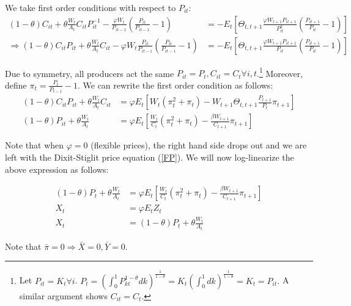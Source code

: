 \documentclass[11pt]{article} %
\begin{document}
We take first order conditions with respect to $P_{it}$:
\begin{align*}
(1-\theta)C_{it} + \theta\frac{W_t}{A_t}C_{it}P_{it}^{-1} - \frac{\varphi W_t}{P_{it-1}}\left(\frac{P_{it}}{P_{it-1}} - 1 \right) &=-E_t\left[\Theta_{t,t+1}\frac{\varphi W_{t+1}P_{it+1}}{P_{it}^2}\left( \frac{P_{it+1}}{P_{it}} - 1 \right) \right]\\
\Rightarrow  (1-\theta)C_{it}P_{it} + \theta\frac{W_t}{A_t}C_{it} - \varphi W_t \frac{P_{it}}{P_{it-1}}\left(\frac{P_{it}}{P_{it-1}} - 1 \right) &=-E_t\left[\Theta_{t,t+1}\frac{\varphi W_{t+1}P_{it+1}}{P_{it}}\left( \frac{P_{it+1}}{P_{it}} - 1 \right) \right]
\end{align*}

Due to symmetry, all producers act the same $P_{it} = P_t,C_{it}=C_t \forall i,t$.\footnote{Let $P_{it} = K_t \forall i$. $P_t = \left(\int_{0}^1P_{kt}^{1-\theta}dk\right)^{\frac{1}{1-\theta}} = K_t\left(\int_{0}^1dk\right)^{\frac{1}{1-\theta}} = K_t = P_{it}.$ A similar argument shows $C_{it} = C_{t}$.} Moreover, define $\pi_t = \frac{P_t}{P_{t-1} }-1$. We can rewrite the first order condition as follows:
\begin{align*}
  (1-\theta)C_{it}P_{it} + \theta\frac{W_t}{A_t}C_{it} &=\varphi E_t\left[ W_{t}(\pi_t^2 + \pi_t) - W_{t+1}\Theta_{t,t+1}\frac{P_{t+1}}{P_t}\pi_{t+1}   \right]\\
  (1-\theta)P_{it} + \theta\frac{W_t}{A_t} &=\varphi E_t\left[ \frac{W_{t}}{C_t}(\pi_t^2 + \pi_t) - \frac{\beta W_{t+1}}{C_{t+1}}\pi_{t+1}  \right]
\end{align*}

Note that when $\varphi = 0$ (flexible prices), the right hand side drops out and we are left with the Dixit-Stiglit price equation (\ref{FP}). We will now log-linearize the above expression as follows:

\begin{align*}
 (1-\theta)P_{t} + \theta\frac{W_t}{A_t} &=\varphi E_t\left[ \frac{W_{t}}{C_t}(\pi_t^2 + \pi_t) - \frac{\beta W_{t+1}}{C_{t+1}}\pi_{t+1}  \right]\\
X_t &= \varphi E_t Z_t\\
X_t &=  (1-\theta)P_{t} + \theta\frac{W_t}{A_t}
\end{align*}

Note that $\bar{\pi} = 0 \Rightarrow \bar{X} = 0, \bar{Y} = 0.$
\end{document}
